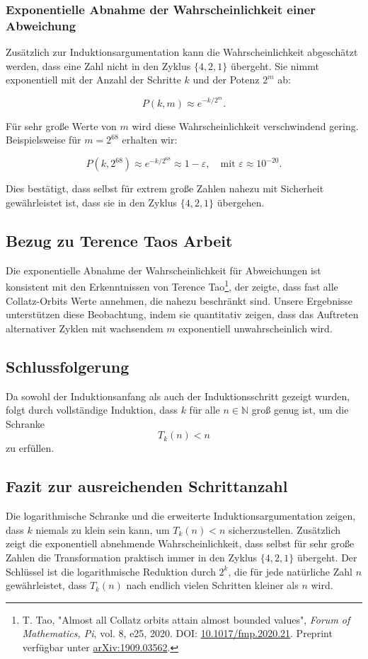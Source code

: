\documentclass[a4paper,12pt]{article}
\begin{document}
\subsubsection{Exponentielle Abnahme der Wahrscheinlichkeit einer Abweichung}
Zusätzlich zur Induktionsargumentation kann die Wahrscheinlichkeit abgeschätzt werden, dass eine Zahl nicht in den Zyklus \( \{4,2,1\} \) übergeht. Sie nimmt exponentiell mit der Anzahl der Schritte \( k \) und der Potenz \( 2^m \) ab:

\[
P(k, m) \approx e^{-k/2^m}.
\]

Für sehr große Werte von \( m \) wird diese Wahrscheinlichkeit verschwindend gering. Beispielsweise für \( m = 2^{68} \) erhalten wir:

\[
P(k, 2^{68}) \approx e^{-k/2^{68}} \approx 1 - \varepsilon, \quad \text{mit } \varepsilon \approx 10^{-20}.
\]

Dies bestätigt, dass selbst für extrem große Zahlen nahezu mit Sicherheit gewährleistet ist, dass sie in den Zyklus \( \{4,2,1\} \) übergehen.

\subsection{Bezug zu Terence Taos Arbeit}
Die exponentielle Abnahme der Wahrscheinlichkeit für Abweichungen ist konsistent mit den Erkenntnissen von Terence Tao\footnote{T. Tao, "Almost all Collatz orbits attain almost bounded values", \textit{Forum of Mathematics, Pi}, vol. 8, e25, 2020. DOI: \href{https://doi.org/10.1017/fmp.2020.21}{10.1017/fmp.2020.21}. Preprint verfügbar unter \href{https://arxiv.org/abs/1909.03562}{arXiv:1909.03562}.}, der zeigte, dass fast alle Collatz-Orbits Werte annehmen, die nahezu beschränkt sind. Unsere Ergebnisse unterstützen diese Beobachtung, indem sie quantitativ zeigen, dass das Auftreten alternativer Zyklen mit wachsendem \( m \) exponentiell unwahrscheinlich wird.

\subsection{Schlussfolgerung}
Da sowohl der Induktionsanfang als auch der Induktionsschritt gezeigt wurden, folgt durch vollständige Induktion, dass \( k \) für alle \( n \in \mathbb{N} \) groß genug ist, um die Schranke
\[
T_k(n) < n
\]
zu erfüllen.

\subsection{Fazit zur ausreichenden Schrittanzahl}
Die logarithmische Schranke und die erweiterte Induktionsargumentation zeigen, dass \( k \) niemals zu klein sein kann, um \( T_k(n) < n \) sicherzustellen. Zusätzlich zeigt die exponentiell abnehmende Wahrscheinlichkeit, dass selbst für sehr große Zahlen die Transformation praktisch immer in den Zyklus \( \{4,2,1\} \) übergeht. Der Schlüssel ist die logarithmische Reduktion durch \( 2^k \), die für jede natürliche Zahl \( n \) gewährleistet, dass \( T_k(n) \) nach endlich vielen Schritten kleiner als \( n \) wird.
\end{document}
